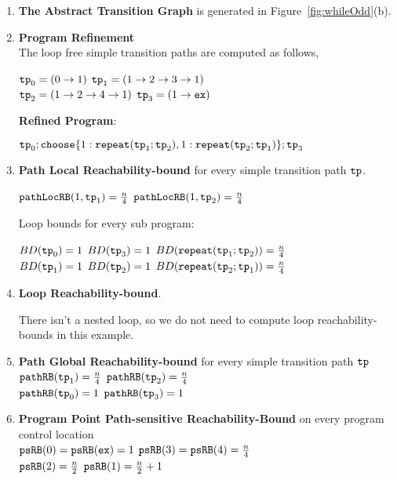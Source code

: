   \begin{enumerate}
    \item  \textbf{The Abstract Transition Graph} is generated in Figure~\ref{fig:whileOdd}(b).
    \item \textbf{Program Refinement}
    \\
    The loop free simple transition paths are computed as follows,

    
      $\mathtt{tp}_0 = (0 \to 1)$
      \quad
      $\mathtt{tp}_1 = (1 \to 2 \to 3 \to 1)$
      \\
      $\mathtt{tp}_2 = (1 \to 2 \to 4 \to 1)$
      \quad
      $\mathtt{tp}_3 = (1 \to \mathtt{ex})$

      
  \textbf{Refined Program}:

    $\tpath_0 ; \rpchoose{1: \rprepeat(\tpath_1; \tpath_2) , 
    1: \rprepeat(\tpath_2; \tpath_1)}; \tpath_3$

    \item \textbf{Path Local Reachability-bound} for every simple transition path $\mathtt{tp}$.

      $\mathtt{pathLocRB}(1, \mathtt{tp}_1) = \frac{n}{4}$ 
      \quad
      $\mathtt{pathLocRB}(1, \mathtt{tp}_2) = \frac{n}{4}$

  Loop bounds for every sub program:

        $BD(\mathtt{tp}_0) = 1$
        \quad
       $ BD(\mathtt{tp}_3) = 1$
        \quad
       $ BD(\mathtt{repeat}(\mathtt{tp}_1; \mathtt{tp}_2)) = \frac{n}{4}$
        \\
        $BD(\mathtt{tp}_1) = 1 $
        \quad
        $BD(\mathtt{tp}_2) = 1 $
        \quad
       $ BD(\mathtt{repeat}(\mathtt{tp}_2; \mathtt{tp}_1)) = \frac{n}{4}$
    \item \textbf{{Loop Reachability-bound}}.
    
    There isn't a nested loop, so we do not need to compute loop reachability-bounds in this example.
    
    \item \textbf{Path Global Reachability-bound} for every simple transition path $\mathtt{tp}$
    \\
    $\mathtt{pathRB}(\mathtt{tp}_1) = \frac{n}{4} $ \quad
    $\mathtt{pathRB}(\mathtt{tp}_2) = \frac{n}{4} $ \\
    $\mathtt{pathRB}(\mathtt{tp}_0) = 1$ \quad
    $\mathtt{pathRB}(\mathtt{tp}_3) = 1$ 

    \item \textbf{Program Point Path-sensitive Reachability-Bound} on every program control location
  \\
  $\mathtt{psRB}(0) = \mathtt{psRB}(\mathtt{ex}) = 1$ \quad
  $\mathtt{psRB}(3) = \mathtt{psRB}(4) = \frac{n}{4}$ \\
  $\mathtt{psRB}(2) = \frac{n}{2}$ \quad 
  $\mathtt{psRB}(1) = \frac{n}{2} + 1$
  \end{enumerate}